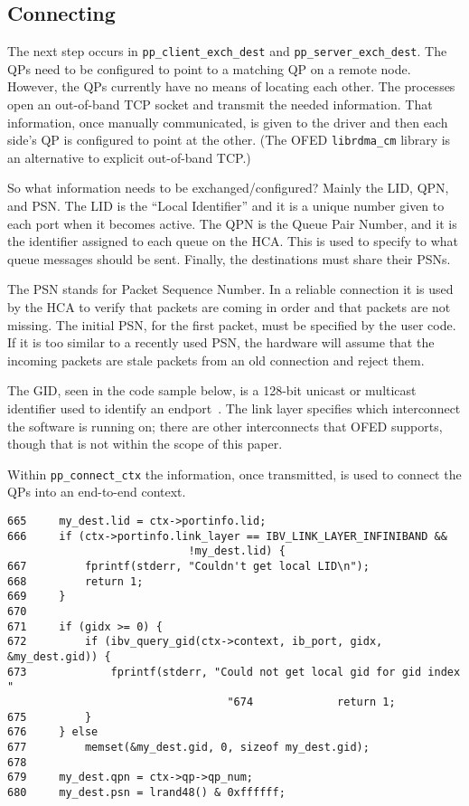 \documentclass[letterpaper,12pt]{article}
\begin{document}
\subsection{Connecting}

The next step occurs in {\tt pp\_client\_exch\_dest}
and {\tt pp\_server\_exch\_dest}. The QPs need to be configured to point to a
matching QP on a remote node. However, the QPs currently have no means of
locating each other. The processes open an out-of-band TCP socket
and transmit the needed information. That information, once manually
communicated, is given to the driver and then each side's QP is configured to
point at the other. (The OFED {\tt librdma\_cm} library is an alternative
to explicit out-of-band TCP.)

So what information needs to be exchanged/configured? Mainly the LID, QPN,
and PSN. The LID is the ``Local Identifier'' and it is a unique number given
to each port when it becomes active. The QPN is the Queue Pair Number,
and it is the identifier assigned to each queue on the HCA. This is
used to specify to what queue messages should be sent. Finally, the
destinations must share their PSNs.

The PSN stands for Packet Sequence Number. In a reliable connection it
is used by the HCA to verify that packets are coming in order and that
packets are not missing. The initial PSN, for the first packet, must be
specified by the user code. If it is too similar to a recently used PSN,
the hardware will assume that the incoming packets are stale packets
from an old connection and reject them.

The GID, seen in the code sample below, is a 128-bit unicast or multicast
identifier used to identify an endport~\cite[page~74]{spec}. The link layer specifies
which interconnect the software is running on; there are other interconnects
that OFED supports, though that is not within the scope of this paper.

Within {\tt pp\_connect\_ctx} the information, once transmitted, is used to
connect the QPs into an end-to-end context.

\lstset{language=C, caption=Setting Up Destination Information}
\begin{lstlisting}
665     my_dest.lid = ctx->portinfo.lid;
666     if (ctx->portinfo.link_layer == IBV_LINK_LAYER_INFINIBAND &&
							!my_dest.lid) {
667         fprintf(stderr, "Couldn't get local LID\n");
668         return 1;
669     }
670
671     if (gidx >= 0) {
672         if (ibv_query_gid(ctx->context, ib_port, gidx, &my_dest.gid)) {
673             fprintf(stderr, "Could not get local gid for gid index "
							      "674             return 1;
675         }
676     } else
677         memset(&my_dest.gid, 0, sizeof my_dest.gid);
678
679     my_dest.qpn = ctx->qp->qp_num;
680     my_dest.psn = lrand48() & 0xffffff;
\end{lstlisting}
\end{document}

